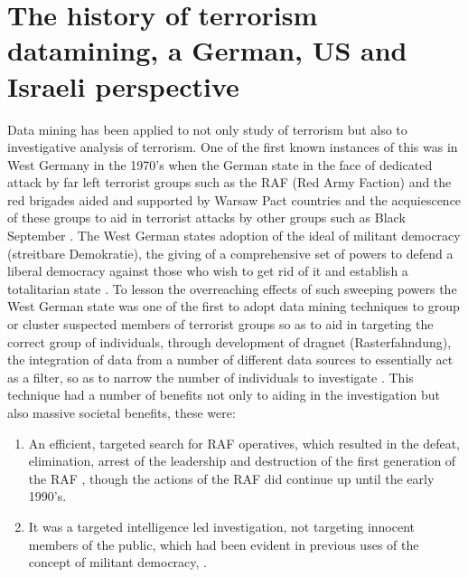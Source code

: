 \section{The history of terrorism datamining, a German, US and Israeli perspective}
Data mining has been applied to not only study of terrorism but also to investigative analysis of terrorism. One of the first known instances of this was in West Germany in the 1970's when the German state in the face of dedicated attack by far left terrorist  groups such as the RAF (Red Army Faction) and the red brigades aided and supported by Warsaw Pact countries \citep{leighton2014strange} and the acquiescence of these groups to aid in terrorist attacks by other groups such as Black September
\citep{nacos2016terrorism}. The West German states adoption of the ideal of militant democracy (streitbare Demokratie), the giving of a comprehensive set of powers to defend a liberal democracy against those who wish to get rid of it and establish a totalitarian state \citep{rosenfeld2014militant}. To lesson the overreaching effects of such sweeping powers the West German state was one of the first to adopt data mining techniques to group or cluster suspected members of terrorist groups so as to aid in targeting the correct group of individuals, through development of dragnet (Rasterfahndung), the integration of data from a number of different data sources to essentially act as  a filter, so as to narrow the number of individuals to investigate \citep{weinhauer2014terror}. This technique had a number of benefits not only to aiding in the investigation but also massive societal benefits, these were:
\begin{enumerate}
\item An efficient, targeted search for RAF operatives, which resulted in the defeat, elimination, arrest of the leadership \citep{hauser1997baader} and destruction of the first generation of the RAF \citep{weinhauer2006terrorismus}, though the actions of the RAF did continue up until the early 1990's.
\item It was a targeted intelligence led investigation, not targeting innocent members of the public, which had been evident in previous uses of the concept of militant democracy, \citep{de2010counter}.
\end{enumerate}

